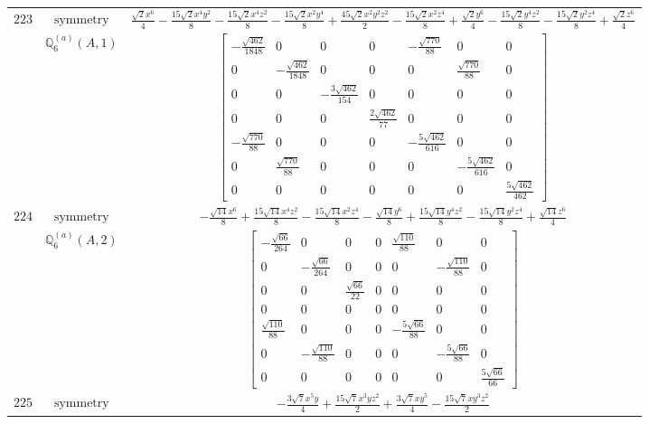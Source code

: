 \documentclass[fleqn,8pt,landscape]{jsarticle}
\begin{document}
\begin{longtable}{ccc}
$ 223 $ & $ \text{symmetry} $ & $ \frac{\sqrt{2} x^{6}}{4} - \frac{15 \sqrt{2} x^{4} y^{2}}{8} - \frac{15 \sqrt{2} x^{4} z^{2}}{8} - \frac{15 \sqrt{2} x^{2} y^{4}}{8} + \frac{45 \sqrt{2} x^{2} y^{2} z^{2}}{2} - \frac{15 \sqrt{2} x^{2} z^{4}}{8} + \frac{\sqrt{2} y^{6}}{4} - \frac{15 \sqrt{2} y^{4} z^{2}}{8} - \frac{15 \sqrt{2} y^{2} z^{4}}{8} + \frac{\sqrt{2} z^{6}}{4} $ \\
$  $ & $ \mathbb{Q}_{6}^{(a)}(A,1) $ & $ \begin{bmatrix} - \frac{\sqrt{462}}{1848} & 0 & 0 & 0 & - \frac{\sqrt{770}}{88} & 0 & 0 \\ 0 & - \frac{\sqrt{462}}{1848} & 0 & 0 & 0 & \frac{\sqrt{770}}{88} & 0 \\ 0 & 0 & - \frac{3 \sqrt{462}}{154} & 0 & 0 & 0 & 0 \\ 0 & 0 & 0 & \frac{2 \sqrt{462}}{77} & 0 & 0 & 0 \\ - \frac{\sqrt{770}}{88} & 0 & 0 & 0 & - \frac{5 \sqrt{462}}{616} & 0 & 0 \\ 0 & \frac{\sqrt{770}}{88} & 0 & 0 & 0 & - \frac{5 \sqrt{462}}{616} & 0 \\ 0 & 0 & 0 & 0 & 0 & 0 & \frac{5 \sqrt{462}}{462} \end{bmatrix} $ \\ \hline
$ 224 $ & $ \text{symmetry} $ & $ - \frac{\sqrt{14} x^{6}}{8} + \frac{15 \sqrt{14} x^{4} z^{2}}{8} - \frac{15 \sqrt{14} x^{2} z^{4}}{8} - \frac{\sqrt{14} y^{6}}{8} + \frac{15 \sqrt{14} y^{4} z^{2}}{8} - \frac{15 \sqrt{14} y^{2} z^{4}}{8} + \frac{\sqrt{14} z^{6}}{4} $ \\
$  $ & $ \mathbb{Q}_{6}^{(a)}(A,2) $ & $ \begin{bmatrix} - \frac{\sqrt{66}}{264} & 0 & 0 & 0 & \frac{\sqrt{110}}{88} & 0 & 0 \\ 0 & - \frac{\sqrt{66}}{264} & 0 & 0 & 0 & - \frac{\sqrt{110}}{88} & 0 \\ 0 & 0 & \frac{\sqrt{66}}{22} & 0 & 0 & 0 & 0 \\ 0 & 0 & 0 & 0 & 0 & 0 & 0 \\ \frac{\sqrt{110}}{88} & 0 & 0 & 0 & - \frac{5 \sqrt{66}}{88} & 0 & 0 \\ 0 & - \frac{\sqrt{110}}{88} & 0 & 0 & 0 & - \frac{5 \sqrt{66}}{88} & 0 \\ 0 & 0 & 0 & 0 & 0 & 0 & \frac{5 \sqrt{66}}{66} \end{bmatrix} $ \\ \hline
$ 225 $ & $ \text{symmetry} $ & $ - \frac{3 \sqrt{7} x^{5} y}{4} + \frac{15 \sqrt{7} x^{3} y z^{2}}{2} + \frac{3 \sqrt{7} x y^{5}}{4} - \frac{15 \sqrt{7} x y^{3} z^{2}}{2} $ \\

\end{longtable}
\end{document}
